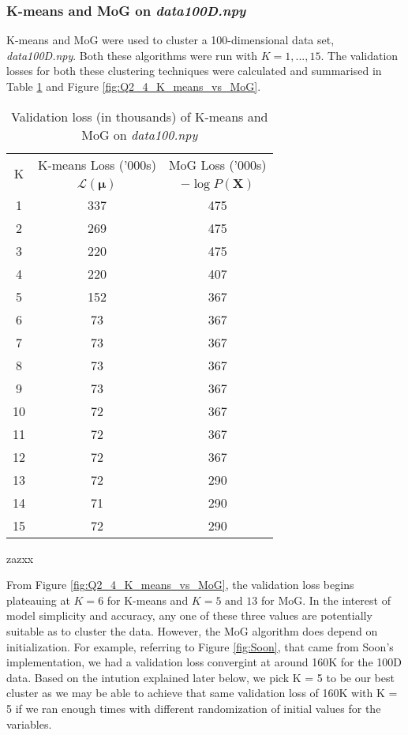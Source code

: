 \documentclass[a4paper,12pt]{article}
\begin{document}
\clearpage
\subsubsection{K-means and MoG on \textit{data100D.npy}}
K-means and MoG were used to cluster a 100-dimensional data set, \textit{data100D.npy}. Both these algorithms were run with $K = 1, ..., 15$. The validation losses for both these clustering techniques were calculated and summarised in Table \ref{tab:MoG/Q2.4_100D_valid_losses} and Figure \ref{fig:Q2_4_K_means_vs_MoG}.


\begin{table}[!htb]
\centering
\caption{Validation loss (in thousands) of K-means and MoG on \textit{data100.npy}}
\label{tab:MoG/Q2.4_100D_valid_losses}
\begin{tabular}{|c|c|c|} \hline
\multirow{2}{*}{K} & K-means Loss ('000s) & MoG Loss ('000s) \\
\cline{2-3}
 & $\mathcal{L}(\bm{\mu})$ & $-\log P(\mathbf{X})$ \\ \hline
1 & 337 & 475 \\
2 & 269 & 475 \\
3 & 220 & 475 \\
4 & 220 & 407 \\
5 & 152 & 367 \\
6 & 73 & 367 \\
7 & 73 & 367 \\
8 & 73 & 367 \\
9 & 73 & 367 \\
10 & 72 & 367 \\
11 & 72 & 367 \\
12 & 72 & 367 \\
13 & 72 & 290 \\
14 & 71 & 290 \\
15 & 72 & 290 \\ \hline
\end{tabular}
zazxx\end{table}

\clearpage

From Figure \ref{fig:Q2_4_K_means_vs_MoG}, the validation loss begins plateauing at $K=6$ for K-means and $K = 5 \text{ and } 13$ for MoG. In the interest of model simplicity and accuracy, any one of these three values are potentially suitable as to cluster the data. However, the MoG algorithm does depend on initialization. For example, 
referring to Figure \ref{fig:Soon}, that came from Soon's implementation, we had a validation loss convergint at around 160K for the 100D data. Based on the intution explained later below, we pick K = 5 to be our best cluster as we may be able to achieve that same validation loss of 160K with K = 5 if we ran enough times with different randomization of initial values for the variables. 
\end{document}
